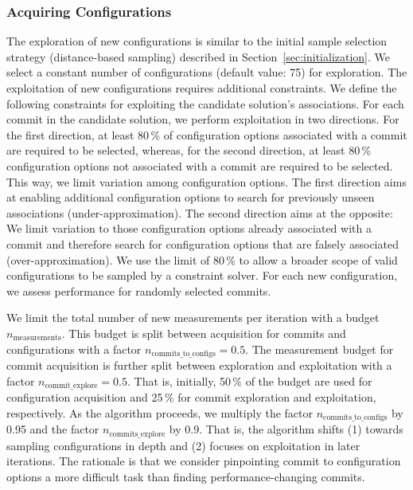 \documentclass[sigconf]{acmart}
\begin{document}
 	\subsubsection{Acquiring Configurations}
 	The exploration of new configurations is similar to the initial sample selection strategy (distance-based sampling) described in Section~\ref{sec:initialization}. We select a constant number of configurations (default value: 75) for exploration. The exploitation of new configurations requires additional constraints. We define the following constraints for exploiting the candidate solution's associations. For each commit in the candidate solution, we perform exploitation in two directions. For the first direction, at least 80\,\% of  configuration options associated with a commit are required to be selected, whereas, for the second direction, at least 80\,\% configuration options not associated with a commit are required to be selected. This way, we limit variation among configuration options. The first direction aims at enabling additional configuration options to search for previously unseen associations (under-approximation). The second direction aims at the opposite: We limit variation to those configuration options already associated with a commit and therefore search for configuration options that are falsely associated (over-approximation). We use the limit of 80\,\% to allow a broader scope of valid configurations to be sampled by a constraint solver. For each new configuration, we assess performance for randomly selected commits.
 	
 	We limit the total number of new measurements per iteration with a budget $n_\text{measurements}$. This budget is split between acquisition for commits and configurations with a factor $n_\text{commits\_to\_configs} = 0.5$. The measurement budget for commit acquisition is further split between exploration and exploitation with a factor $n_\text{commit\_explore} = 0.5$. That is, initially, 50\,\% of the budget are used for configuration acquisition and 25\,\% for commit exploration and exploitation, respectively. As the algorithm proceeds, we multiply the factor $n_\text{commits\_to\_configs}$ by 0.95 and the factor $n_\text{commits\_explore}$ by 0.9. That is, the algorithm shifts  (1) towards sampling configurations in depth and (2) focuses on exploitation in later iterations. The rationale is that we consider pinpointing commit to configuration options a more difficult task than finding performance-changing commits.
 	
\end{document}
